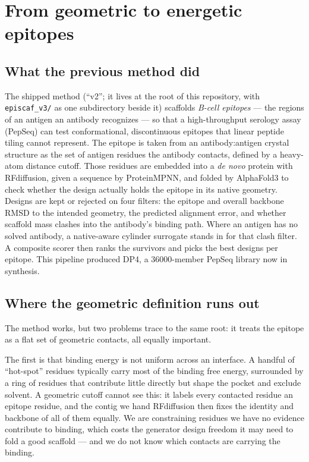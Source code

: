 \section{From geometric to energetic epitopes}\label{sec:intro}

\subsection{What the previous method did}
The shipped method (``v2''; it lives at the root of this repository, with \texttt{episcaf\_v3/} as
one subdirectory beside it) scaffolds \emph{B-cell epitopes} --- the regions of an antigen an
antibody recognizes --- so that a high-throughput serology assay (PepSeq) can test
conformational, discontinuous epitopes that linear peptide tiling cannot represent. The epitope is
taken from an antibody:antigen crystal structure as the set of antigen residues the antibody
contacts, defined by a heavy-atom distance cutoff. Those residues are embedded into a \emph{de novo}
protein with RFdiffusion, given a sequence by ProteinMPNN, and folded by AlphaFold3 to check whether
the design actually holds the epitope in its native geometry. Designs are kept or rejected on four
filters: the epitope and overall backbone RMSD to the intended geometry, the predicted alignment
error, and whether scaffold mass clashes into the antibody's binding path. Where an antigen has no
solved antibody, a native-aware cylinder surrogate stands in for that clash filter. A composite
scorer then ranks the survivors and picks the best designs per epitope. This pipeline produced DP4,
a \num{36000}-member PepSeq library now in synthesis.

\subsection{Where the geometric definition runs out}
The method works, but two problems trace to the same root: it treats the epitope as a flat set of
geometric contacts, all equally important.

The first is that binding energy is not uniform across an interface. A handful of ``hot-spot''
residues typically carry most of the binding free energy, surrounded by a ring of residues that
contribute little directly but shape the pocket and exclude solvent. A geometric cutoff cannot see
this: it labels every contacted residue an epitope residue, and the contig we hand RFdiffusion then
fixes the identity and backbone of all of them equally. We are constraining residues we have no
evidence contribute to binding, which costs the generator design freedom it may need to fold a good
scaffold --- and we do not know which contacts are carrying the binding.

